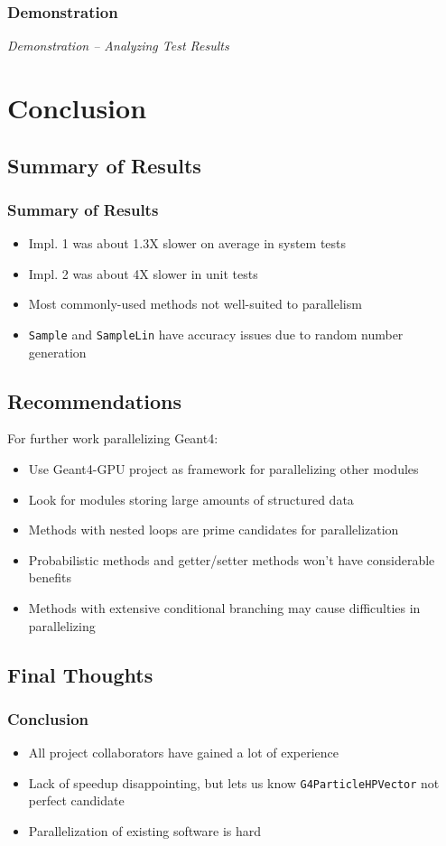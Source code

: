 \documentclass{beamer}
\begin{document}
\begin{frame}
\frametitle{Demonstration}
\begin{center}
\emph{Demonstration -- Analyzing Test Results}
\end{center}
\end{frame}

\section{Conclusion}
\subsection{Summary of Results}
\begin{frame}
\frametitle{Summary of Results}
\begin{itemize}
\item Impl. 1 was about 1.3X slower on average in system tests
\item Impl. 2 was about 4X slower in unit tests
\item Most commonly-used methods not well-suited to parallelism
\item \texttt{Sample} and \texttt{SampleLin} have accuracy issues due to random number generation
\end{itemize}
\end{frame}

\subsection{Recommendations}
\begin{frame}
For further work parallelizing Geant4:
\begin{itemize}
\item Use Geant4-GPU project as framework for parallelizing other modules
\item Look for modules storing large amounts of structured data
\item Methods with nested loops are prime candidates for parallelization
\item Probabilistic methods and getter/setter methods won't have considerable benefits
\item Methods with extensive conditional branching may cause difficulties in parallelizing
\end{itemize}
\end{frame}

\subsection{Final Thoughts}
\begin{frame}
\frametitle{Conclusion}
\begin{itemize}
\item All project collaborators have gained a lot of experience
\item Lack of speedup disappointing, but lets us know \texttt{G4ParticleHPVector} not perfect candidate
\item Parallelization of existing software is hard
\end{itemize}
\end{frame}
\end{document}
